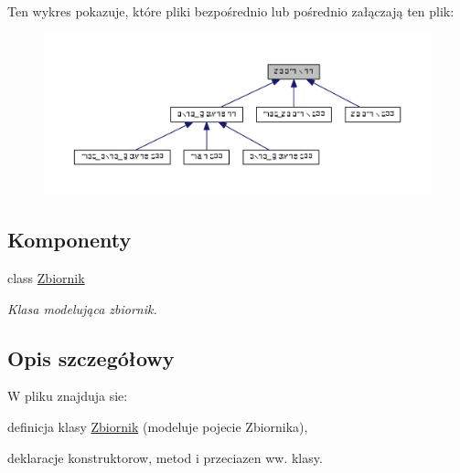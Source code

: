 Ten wykres pokazuje, które pliki bezpośrednio lub pośrednio załączają ten plik\+:\nopagebreak
\begin{figure}[H]
\begin{center}
\leavevmode
\includegraphics[width=350pt]{zbiornik_8hh__dep__incl}
\end{center}
\end{figure}
\subsection*{Komponenty}
\begin{DoxyCompactItemize}
\item 
class \hyperlink{class_zbiornik}{Zbiornik}
\begin{DoxyCompactList}\small\item\em Klasa modelująca zbiornik. \end{DoxyCompactList}\end{DoxyCompactItemize}


\subsection{Opis szczegółowy}
W pliku znajduja sie\+:
\begin{DoxyItemize}
\item definicja klasy \hyperlink{class_zbiornik}{Zbiornik} (modeluje pojecie Zbiornika),
\item deklaracje konstruktorow, metod i przeciazen ww. klasy. 
\end{DoxyItemize}